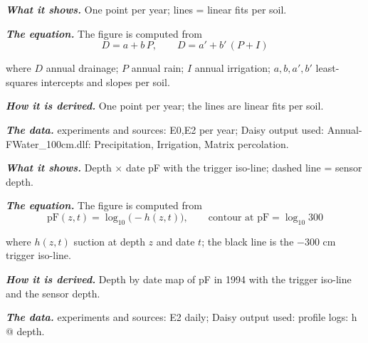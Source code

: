 \par\vspace{6pt}\noindent{}\par\nobreak
{}\label{fig:a19_21}
\par\noindent\textbf{\color{khmag}\emph{What it shows.}} One point per year; lines = linear fits per soil.
\par\noindent\textbf{\color{khmag}\emph{The equation.}} The figure is computed from
\begin{equation}\boxed{D=a+b\,P,\qquad D=a'+b'\,(P+I)}\end{equation}
\par\noindent where $D$ annual drainage; $P$ annual rain; $I$ annual irrigation; $a,b,a',b'$ least-squares intercepts and slopes per soil.
\par\noindent\textbf{\color{khmag}\emph{How it is derived.}} One point per year; the lines are linear fits per soil.
\par\noindent\textbf{\color{khmag}\emph{The data.}} experiments and sources: E0,E2 per year; Daisy output used: Annual-FWater\_100cm.dlf: Precipitation, Irrigation, Matrix percolation.
\par\vspace{6pt}\noindent{}\par\nobreak
{}\label{fig:a19_22}
\par\noindent\textbf{\color{khmag}\emph{What it shows.}} Depth $\times$ date pF with the trigger iso-line; dashed line = sensor depth.
\par\noindent\textbf{\color{khmag}\emph{The equation.}} The figure is computed from
\begin{equation}\boxed{\mathrm{pF}(z,t)=\log_{10}\bigl(-h(z,t)\bigr),\qquad \text{contour at } \mathrm{pF}=\log_{10}300}\end{equation}
\par\noindent where $h(z,t)$ suction at depth $z$ and date $t$; the black line is the $-300$ cm trigger iso-line.
\par\noindent\textbf{\color{khmag}\emph{How it is derived.}} Depth by date map of pF in 1994 with the trigger iso-line and the sensor depth.
\par\noindent\textbf{\color{khmag}\emph{The data.}} experiments and sources: E2 daily; Daisy output used: profile logs: h @ depth.
